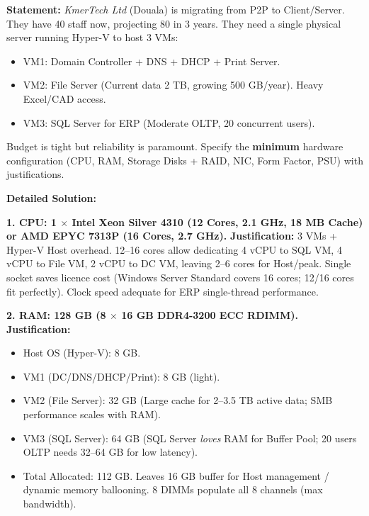 \documentclass[11pt]{article}
\begin{document}
\begin{exoresolu}
\textbf{Statement:}
\textit{KmerTech Ltd} (Douala) is migrating from P2P to Client/Server. They have 40 staff now, projecting 80 in 3 years. They need a single physical server running Hyper-V to host 3 VMs:
\begin{itemize}
    \item VM1: Domain Controller + DNS + DHCP + Print Server.
    \item VM2: File Server (Current data 2 TB, growing 500 GB/year). Heavy Excel/CAD access.
    \item VM3: SQL Server for ERP (Moderate OLTP, 20 concurrent users).
\end{itemize}
Budget is tight but reliability is paramount. Specify the \textbf{minimum} hardware configuration (CPU, RAM, Storage Disks + RAID, NIC, Form Factor, PSU) with justifications.

\tcblower
\textbf{Detailed Solution:}

\noindent\textbf{1. CPU: 1 $\times$ Intel Xeon Silver 4310 (12 Cores, 2.1 GHz, 18 MB Cache) or AMD EPYC 7313P (16 Cores, 2.7 GHz).}
\textbf{Justification:} 3 VMs + Hyper-V Host overhead. 12--16 cores allow dedicating 4 vCPU to SQL VM, 4 vCPU to File VM, 2 vCPU to DC VM, leaving 2--6 cores for Host/peak. Single socket saves licence cost (Windows Server Standard covers 16 cores; 12/16 cores fit perfectly). Clock speed adequate for ERP single-thread performance.

\noindent\textbf{2. RAM: 128 GB (8 $\times$ 16 GB DDR4-3200 ECC RDIMM).}
\textbf{Justification:}
\begin{itemize}
    \item Host OS (Hyper-V): 8 GB.
    \item VM1 (DC/DNS/DHCP/Print): 8 GB (light).
    \item VM2 (File Server): 32 GB (Large cache for 2--3.5 TB active data; SMB performance scales with RAM).
    \item VM3 (SQL Server): 64 GB (SQL Server \emph{loves} RAM for Buffer Pool; 20 users OLTP needs 32--64 GB for low latency).
    \item Total Allocated: 112 GB. Leaves 16 GB buffer for Host management / dynamic memory ballooning. 8 DIMMs populate all 8 channels (max bandwidth).
\end{itemize}


\end{exoresolu}
\end{document}
